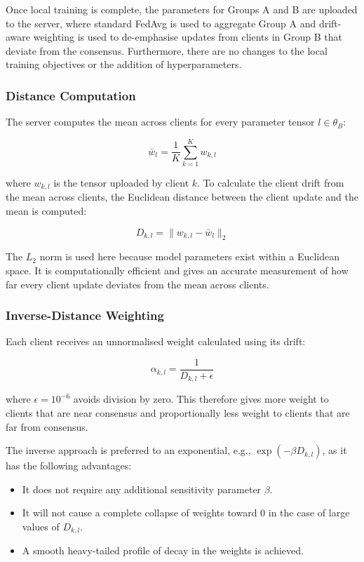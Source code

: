 \documentclass[utf8]{FrontiersinHarvard} %
\begin{document}
Once local training is complete, the parameters for Groups A and B are uploaded to the server, where standard FedAvg is used to aggregate Group A and drift-aware weighting is used to de-emphasise updates from clients in Group B that deviate from the consensus. Furthermore, there are no changes to the local training objectives or the addition of hyperparameters.

\subsubsection{Distance Computation}

The server computes the mean across clients for every parameter tensor $l \in \theta_B$:

\begin{equation}
\label{eq:consensus_mean}
\bar{w}_l = \frac{1}{K} \sum_{k=1}^{K} w_{k,l}
\end{equation}

where $w_{k,l}$ is the tensor uploaded by client $k$. To calculate the client drift from the mean across clients, the Euclidean distance between the client update and the mean is computed:

\begin{equation}
\label{eq:drift_distance}
D_{k,l} = \| w_{k,l} - \bar{w}_l \|_2
\end{equation}

The $L_2$ norm is used here because model parameters exist within a Euclidean space. It is computationally efficient and gives an accurate measurement of how far every client update deviates from the mean across clients.

\subsubsection{Inverse-Distance Weighting}

Each client receives an unnormalised weight calculated using its drift:

\begin{equation}
\label{eq:inv_weight}
\alpha_{k,l} = \frac{1}{D_{k,l} + \epsilon}
\end{equation}

where $\epsilon = 10^{-6}$ avoids division by zero. This therefore gives more weight to clients that are near consensus and proportionally less weight to clients that are far from consensus.

The inverse approach is preferred to an exponential, e.g., $\exp(-\beta D_{k,l})$, as it has the following advantages:
\begin{itemize}
\item It does not require any additional sensitivity parameter $\beta$.
\item It will not cause a complete collapse of weights toward 0 in the case of large values of $D_{k,l}$.
\item A smooth heavy-tailed profile of decay in the weights is achieved.
\end{itemize}
\end{document}
